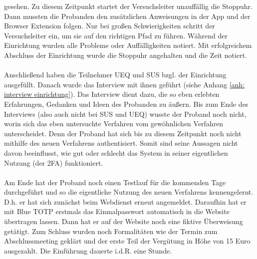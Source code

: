gesehen. 
Zu diesem Zeitpunkt startet der Versuchsleiter unauffällig die Stoppuhr. Dann 
mussten die Probanden den zusätzlichen Anweisungen in der App und der Browser 
Extension folgen. Nur bei großen Schwierigkeiten schritt der Versuchsleiter 
ein, um sie auf den richtigen Pfad zu führen. Während der Einrichtung wurden 
alle Probleme oder Auffälligkeiten notiert. Mit erfolgreichem Abschluss der 
Einrichtung wurde die Stoppuhr angehalten und die Zeit notiert.
\\\\
Anschließend haben die Teilnehmer UEQ und SUS bzgl. der Einrichtung  
ausgefüllt. Danach wurde das Interview mit ihnen geführt (siehe Anhang \ref {anh: interview einrichtung}).
Das Interview dient dazu, die so eben erlebten Erfahrungen, Gedanken und Ideen 
des Probanden zu äußern. Bis zum Ende des Interviews (also auch nicht bei SUS und 
UEQ) wusste der Proband noch nicht, worin sich das eben untersuchte Verfahren vom 
gewöhnlichen Verfahren unterscheidet. Denn der Proband hat sich bis zu diesem 
Zeitpunkt noch nicht mithilfe des neuen Verfahrens authentisiert. Somit sind 
seine Aussagen nicht davon beeinflusst, wie gut oder schlecht das System in 
seiner eigentlichen Nutzung (der 2FA) funktioniert.
\\\\
Am Ende hat der Proband noch einen Testlauf für die kommenden Tage 
durchgeführt und so die eigentliche Nutzung des neuen Verfahrens kennengelernt. D.h. er hat sich zunächst beim Webdienst erneut angemeldet. 
Daraufhin hat er mit Blue TOTP erstmals das Einmalpasswort automatisch in die 
Website übertragen lassen. Dann hat er auf der Website noch eine fiktive 
Überweisung getätigt.
Zum Schluss wurden noch Formalitäten wie der Termin zum Abschlussmeeting geklärt 
und der erste Teil der Vergütung in Höhe von 15 Euro ausgezahlt. Die Einführung 
dauerte i.d.R. eine Stunde.